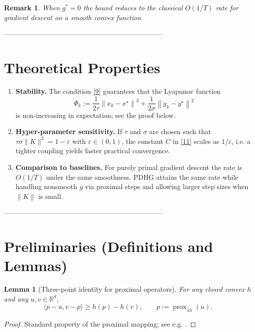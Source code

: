 \documentclass{article}
\newtheorem{lemma}{Lemma}
\newtheorem{remark}{Remark}
\newcommand{\prox}{\operatorname{prox}}
\newcommand{\inner}[2]{\langle #1,#2\rangle}
\newcommand{\norm}[1]{\left\|#1\right\|}
\begin{document}
\begin{remark}
When $g^{*}=0$ the bound reduces to the classical $O(1/T)$ rate for gradient descent on a smooth convex function.
\end{remark}

---------------------------------------------------------------------

\section*{Theoretical Properties}

\begin{enumerate}[label=\arabic*.]
\item \textbf{Stability.}
The condition \eqref{9} guarantees that the Lyapunov function
\[
\Phi_{k}:=\frac{1}{2\tau}\norm{x_{k}-x^{\star}}^{2}
+\frac{1}{2\sigma}\norm{y_{k}-y^{\star}}^{2}
\tag{12}
\]
is non‑increasing in expectation; see the proof below.

\item \textbf{Hyper‑parameter sensitivity.}
If $\tau$ and $\sigma$ are chosen such that $\tau\sigma\|K\|^{2}=1-\varepsilon$ with $\varepsilon\in(0,1)$,
the constant $C$ in \eqref{11} scales as $1/\varepsilon$, i.e. a tighter coupling yields faster practical convergence.

\item \textbf{Comparison to baselines.}
For purely primal gradient descent the rate is $O(1/T)$ under the same smoothness.
PDHG attains the same rate while handling nonsmooth $g$ via proximal steps and allowing larger step sizes when $\|K\|$ is small.

\end{enumerate}

---------------------------------------------------------------------

\section*{Preliminaries (Definitions and Lemmas)}

\begin{lemma}[Three‑point identity for proximal operators]\label{lem:prox}
For any closed convex $h$ and any $u,v\in\mathbb{R}^{d}$,
\[
\inner{p-u}{v-p}\ge h(p)-h(v),\qquad
p:=\prox_{\lambda h}(u).
\tag{13}
\]
\end{lemma}
\begin{proof}
Standard property of the proximal mapping; see e.g. \cite{parikh2014proximal}.
\end{proof}
\end{document}
